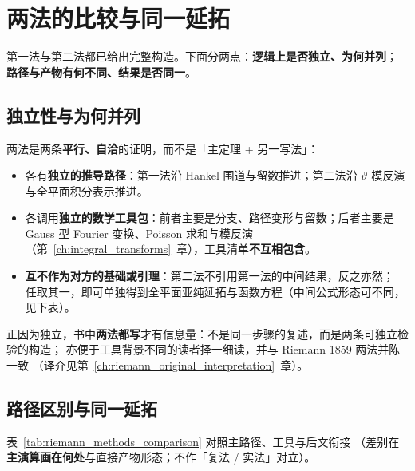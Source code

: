 \section{两法的比较与同一延拓}\label{sec:riemann_two_methods_comparison}

第一法与第二法都已给出完整构造。下面分两点：\textbf{逻辑上是否独立、为何并列}；
\textbf{路径与产物有何不同、结果是否同一}。

\subsection{独立性与为何并列}

两法是两条\textbf{平行、自洽}的证明，而不是「主定理 + 另一写法」：

\begin{itemize}
  \item 各有\textbf{独立的推导路径}：第一法沿 Hankel 围道与留数推进；第二法沿 $\vartheta$ 模反演与全平面积分表示推进。
  \item 各调用\textbf{独立的数学工具包}：前者主要是分支、路径变形与留数；后者主要是 Gauss 型 Fourier 变换、Poisson 求和与模反演（第~\ref{ch:integral_transforms}~章），工具清单\textbf{不互相包含}。
  \item \textbf{互不作为对方的基础或引理}：第二法不引用第一法的中间结果，反之亦然；
        任取其一，即可单独得到全平面亚纯延拓与函数方程（中间公式形态可不同，见下表）。
\end{itemize}

正因为独立，书中\textbf{两法都写}才有信息量：不是同一步骤的复述，而是两条可独立检验的构造；
亦便于工具背景不同的读者择一细读，并与 Riemann 1859 两法并陈一致
（译介见第~\ref{ch:riemann_original_interpretation}~章）。

\subsection{路径区别与同一延拓}

表~\ref{tab:riemann_methods_comparison} 对照主路径、工具与后文衔接
（差别在\textbf{主演算画在何处}与直接产物形态；不作「复法 / 实法」对立）。

